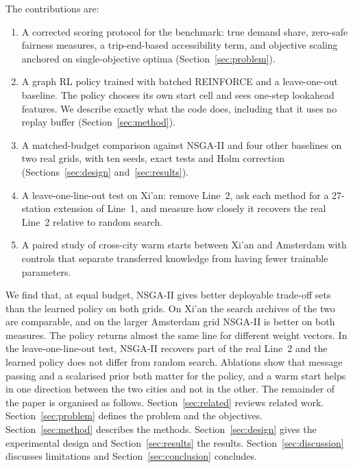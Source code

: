 The contributions are:
\begin{enumerate}
\item A corrected scoring protocol for the benchmark: true demand share, zero-safe fairness measures, a trip-end-based accessibility term, and objective scaling anchored on single-objective optima (Section~\ref{sec:problem}).
\item A graph RL policy trained with batched REINFORCE and a leave-one-out baseline. The policy chooses its own start cell and sees one-step lookahead features. We describe exactly what the code does, including that it uses no replay buffer (Section~\ref{sec:method}).
\item A matched-budget comparison against NSGA-II and four other baselines on two real grids, with ten seeds, exact tests and Holm correction (Sections~\ref{sec:design} and~\ref{sec:results}).
\item A leave-one-line-out test on Xi'an: remove Line~2, ask each method for a 27-station extension of Line~1, and measure how closely it recovers the real Line~2 relative to random search.
\item A paired study of cross-city warm starts between Xi'an and Amsterdam with controls that separate transferred knowledge from having fewer trainable parameters.
\end{enumerate}
We find that, at equal budget, NSGA-II gives better deployable trade-off sets than the learned policy on both grids. On Xi'an the search archives of the two are comparable, and on the larger Amsterdam grid NSGA-II is better on both measures. The policy returns almost the same line for different weight vectors. In the leave-one-line-out test, NSGA-II recovers part of the real Line~2 and the learned policy does not differ from random search. Ablations show that message passing and a scalarised prior both matter for the policy, and a warm start helps in one direction between the two cities and not in the other.
The remainder of the paper is organised as follows. Section~\ref{sec:related} reviews related work. Section~\ref{sec:problem} defines the problem and the objectives. Section~\ref{sec:method} describes the methods. Section~\ref{sec:design} gives the experimental design and Section~\ref{sec:results} the results. Section~\ref{sec:discussion} discusses limitations and Section~\ref{sec:conclusion} concludes.
